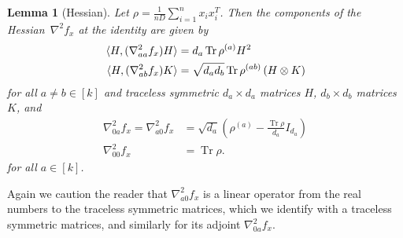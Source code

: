 \documentclass[aos]{imsart}
\newtheorem{lemma}[theorem]{Lemma}
\theoremstyle{definition}
\numberwithin{equation}{section}
\DeclareMathOperator{\tr}{Tr}
\newcommand{\ot}{\otimes}
\newcommand{\samp}{x}
\begin{document}
\begin{lemma}[Hessian]\label{lem:hessian}
Let $\rho = \frac{1}{nD}\sum_{i=1}^n \samp_i \samp_i^T$.
Then the components of the Hessian~$\nabla^2 f_{\samp}$ at the identity are given by
\begin{align*}
  \braket{H, (\nabla^2_{aa} f_x) H} &= d_a \tr \rho^{(a)} H^2 \\
  \braket{H, (\nabla^2_{ab} f_x) K} &= \sqrt{d_a d_b} \tr \rho^{(ab)} \left( H \ot K \right)
\end{align*}
for all $a\neq b\in[k]$ and traceless symmetric $d_a\times d_a$ matrices $H$, $d_b\times d_b$ matrices~$K$, and
\begin{align*}
  \nabla^2_{0a} f_x = \nabla^2_{a0} f_x & =  \sqrt{d_a} \left( \rho^{(a)} - \frac{\tr \rho}{d_a} I_{d_a} \right) \\
  \nabla^2_{00} f_x &= \tr \rho.
\end{align*}
for all $a \in [k]$.
\end{lemma}
Again we caution the reader that $\nabla^2_{a0} f_x$ is a linear operator from the real numbers to the traceless symmetric matrices, which we identify with a traceless symmetric matrices, and similarly for its adjoint $\nabla^2_{0a} f_x$.
\end{document}
